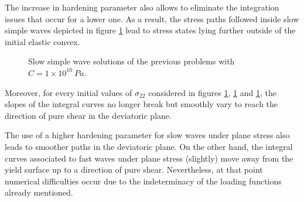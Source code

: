 The increase in hardening parameter also allows to eliminate the integration issues that occur for a lower one.
As a result, the stress paths followed inside slow simple waves depicted in figure \ref{fig:slow_H} lead to stress states lying further outside of the initial elastic convex.
\begin{figure}[h!]
  \centering
  { \label{subfig:slow_H1}}
  { \label{subfig:slow_H2}}
  { \label{subfig:slow_H3}}
  
  \caption{Slow simple wave solutions of the previous problems with $C=1\times10^{10} \: Pa$.}
  \label{fig:slow_H}
\end{figure}
Moreover, for every initial values of $\sigma_{22}$ considered in figures \ref{fig:slow_H}, \ref{fig:slow_H} and \ref{fig:slow_H}, the slopes of the integral curves no longer break but smoothly vary to reach the direction of pure shear in the deviatoric plane.

\begin{remark}
  The use of a higher hardening parameter for slow waves under plane stress also leads to smoother paths in the deviatoric plane.
  On the other hand, the integral curves associated to fast waves under plane stress (slightly) move away from the yield surface up to a direction of pure shear.
  Nevertheless, at that point numerical difficulties occur due to the indeterminacy of the loading functions already mentioned.
\end{remark}


